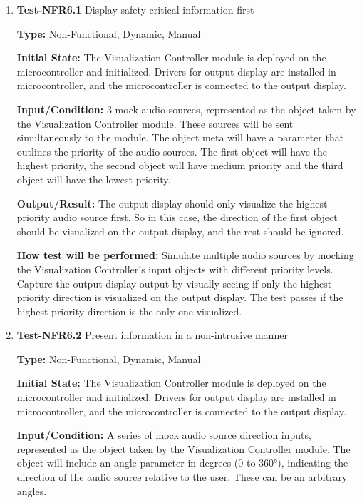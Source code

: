 \documentclass[12pt, titlepage]{article}
\begin{document}
\begin{enumerate}

\item{\textbf{Test-NFR6.1} Display safety critical information first\\}

\textbf{Type:} Non-Functional, Dynamic, Manual
					
\textbf{Initial State:} 
The Visualization Controller module is deployed on the microcontroller and
initialized. Drivers for output display are installed in microcontroller, and
the microcontroller is connected to the output display. 
					
\textbf{Input/Condition:} 
3 mock audio sources, represented as the object taken by the Visualization
Controller module. These sources will be sent simultaneously to the module. The
object meta will have a parameter that outlines the priority of the audio
sources. The first object will have the highest priority, the second object will
have medium priority and the third object will have the lowest priority.

\textbf{Output/Result:} 
The output display should only visualize the highest priority audio source
first. So in this case, the direction of the first object should be visualized
on the output display, and the rest should be ignored. 
					
\textbf{How test will be performed:} 
Simulate multiple audio sources by mocking the Visualization Controller's input
objects with different priority levels. Capture the output display output by
visually seeing if only the highest priority direction is visualized on the
output display. The test passes if the highest priority direction is the only
one visualized.

					
\item{\textbf{Test-NFR6.2} Present information in a non-intrusive manner\\}

\textbf{Type:} Non-Functional, Dynamic, Manual
					
\textbf{Initial State:} 
The Visualization Controller module is deployed on the microcontroller and
initialized. Drivers for output display are installed in microcontroller, and
the microcontroller is connected to the output display. 
					
\textbf{Input/Condition:} 
A series of mock audio source direction inputs, represented as the object taken
by the Visualization Controller module. The object will include an angle
parameter in degrees (0 to 360°), indicating the direction of the audio source
relative to the user. These can be an arbitrary angles.
					

\end{enumerate}
\end{document}
